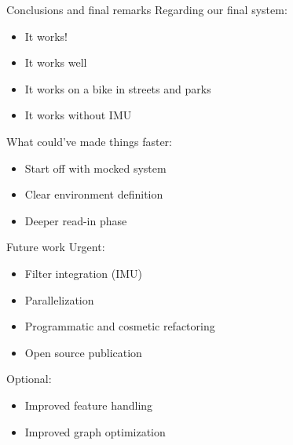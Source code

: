 \documentclass[11pt]{beamer}
\begin{document}
\begin{frame}{Conclusions and final remarks}
Regarding our final system:
\begin{itemize}
\item It works!
\item It works well
\item It works on a bike in streets and parks
\item It works without IMU
\end{itemize}
\vspace{20pt}
What could've made things faster:
\begin{itemize}
\item Start off with mocked system
\item Clear environment definition
\item Deeper read-in phase
\end{itemize}
\end{frame}

\begin{frame}{Future work}
Urgent:
\begin{itemize}
\item Filter integration (IMU)
\item Parallelization
\item Programmatic and cosmetic refactoring
\item Open source publication
\end{itemize}
\vspace{20pt}
Optional:
\begin{itemize}
\item Improved feature handling
\item Improved graph optimization
\end{itemize}
\end{frame}
\end{document}

